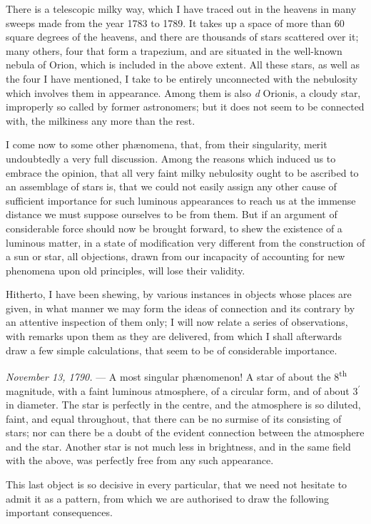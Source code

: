 \documentclass[a4paper, 12pt, oneside, polutonikogreek, english]{article}
\begin{document}
There is a telescopic milky way, which I have traced out in the heavens in many sweeps made from the year 1783 to 1789. It takes up a space of more than 60 square degrees of the heavens, and there are thousands of stars scattered over it; many others, four that form a trapezium, and are situated in the well-known nebula of Orion, which is included in the above extent. All these stars, as well as the four I have mentioned, I take to be entirely unconnected with the nebulosity which involves them in appearance. Among them is also \emph{d} Orionis, a cloudy star, improperly so called by former astronomers; but it does not seem to be connected with, the milkiness any more than the rest.

I come now to some other phænomena, that, from their singularity, merit undoubtedly a very full discussion. Among the reasons which induced us to embrace the opinion, that all very faint milky nebulosity ought to be ascribed to an assemblage of stars is, that we could not easily assign any other cause of sufficient importance for such luminous appearances to reach us at the immense distance we must suppose ourselves to be from them. But if an argument of considerable force should now be brought forward, to shew the existence of a luminous matter, in a state of modification very different from the construction of a sun or star, all objections, drawn from our incapacity of accounting for new phenomena upon old principles, will lose their validity.

Hitherto, I have been shewing, by various instances in objects whose places are given, in what manner we may form the ideas of connection and its contrary by an attentive inspection of them only; I will now relate a series of observations, with remarks upon them as they are delivered, from which I shall afterwards draw a few simple calculations, that seem to be of considerable importance.

\emph{November 13, 1790.} --- A most singular phænomenon! A star of about the 8\textsuperscript{th} magnitude, with a faint luminous atmosphere, of a circular form, and of about 3$^{\prime}$ in diameter. The star is perfectly in the centre, and the atmosphere is so diluted, faint, and equal throughout, that there can be no surmise of its consisting of stars; nor can there be a doubt of the evident connection between the atmosphere and the star. Another star is not much less in brightness, and in the same field with the above, was perfectly free from any such appearance.

This last object is so decisive in every particular, that we need not hesitate to admit it as a pattern, from which we are authorised to draw the following important consequences.
\end{document}
